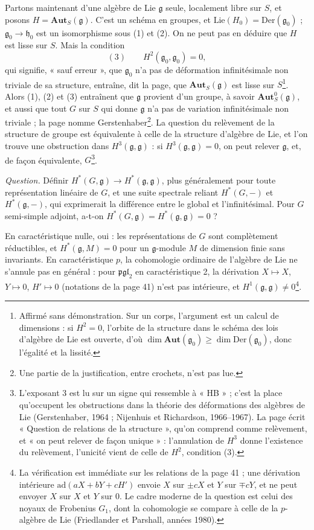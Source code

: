 \documentclass[11pt,a4paper]{article}
\begin{document}
Partons maintenant d'une algèbre de Lie $\mathfrak{g}$ seule, localement libre
sur $S$, et posons $H = \mathbf{Aut}_S(\mathfrak{g})$. C'est un schéma en groupes,
et $\mathrm{Lie}(H_0) = \mathrm{Der}(\mathfrak{g}_0)$ ; $\mathfrak{g}_0 \to
\mathfrak{h}_0$ est un isomorphisme sous (1) et (2). On ne peut pas en déduire que
$H$ est lisse sur $S$. Mais la condition
\[
(3) \qquad H^2(\mathfrak{g}_0, \mathfrak{g}_0) = 0,
\]
qui signifie, « sauf erreur », que $\mathfrak{g}_0$ n'a pas de déformation
infinitésimale non triviale de sa structure, entraîne, dit la page, que
$\mathbf{Aut}_S(\mathfrak{g})$ est lisse sur $S$\footnote{Affirmé sans
démonstration. Sur un corps, l'argument est un calcul de dimensions : si
$H^2 = 0$, l'orbite de la structure dans le schéma des lois d'algèbre de Lie est
ouverte, d'où $\dim \mathbf{Aut}(\mathfrak{g}_0) \geq \dim
\mathrm{Der}(\mathfrak{g}_0)$, donc l'égalité et la lissité.}. Alors (1), (2) et
(3) entraînent que $\mathfrak{g}$ provient d'un groupe, à savoir
$\mathbf{Aut}^0_S(\mathfrak{g})$, et aussi que tout $G$ sur $S$ qui donne
$\mathfrak{g}$ n'a pas de variation infinitésimale non triviale ; la page nomme
Gerstenhaber\footnote{Une partie de la justification, entre crochets, n'est pas
lue.}. La question du relèvement de la structure de groupe est équivalente à
celle de la structure d'algèbre de Lie, et l'on trouve une obstruction dans
$H^3(\mathfrak{g}, \mathfrak{g})$ : si $H^3(\mathfrak{g},\mathfrak{g}) = 0$, on peut
relever $\mathfrak{g}$, et, de façon équivalente, $G$\footnote{L'exposant 3 est lu
sur un signe qui ressemble à « HB » ; c'est la place qu'occupent les
obstructions dans la théorie des déformations des algèbres de Lie
(Gerstenhaber, 1964 ; Nijenhuis et Richardson, 1966--1967). La page écrit
« Question de relations de la structure », qu'on comprend comme relèvement, et
« on peut relever de façon unique » : l'annulation de $H^3$ donne l'existence du
relèvement, l'unicité vient de celle de $H^2$, condition (3).}.

\emph{Question.} Définir $H^*(G, \mathfrak{g}) \to H^*(\mathfrak{g}, \mathfrak{g})$,
plus généralement pour toute représentation linéaire de $G$, et une suite
spectrale reliant $H^*(G, -)$ et $H^*(\mathfrak{g}, -)$, qui exprimerait la
différence entre le global et l'infinitésimal. Pour $G$ semi-simple adjoint,
a-t-on $H^*(G,\mathfrak{g}) = H^*(\mathfrak{g},\mathfrak{g}) = 0$ ?

En caractéristique nulle, oui : les représentations de $G$ sont complètement
réductibles, et $H^*(\mathfrak{g}, M) = 0$ pour un $\mathfrak{g}$-module $M$ de
dimension finie sans invariants. En caractéristique $p$, la cohomologie
ordinaire de l'algèbre de Lie ne s'annule pas en général : pour
$\mathfrak{pgl}_2$ en caractéristique 2, la dérivation $X \mapsto X$, $Y \mapsto 0$,
$H' \mapsto 0$ (notations de la page 41) n'est pas intérieure, et
$H^1(\mathfrak{g},\mathfrak{g}) \neq 0$\footnote{La vérification est immédiate sur
les relations de la page 41 ; une dérivation intérieure $\mathrm{ad}(aX + bY +
cH')$ envoie $X$ sur $\pm cX$ et $Y$ sur $\mp cY$, et ne peut envoyer $X$ sur $X$ et
$Y$ sur $0$. Le cadre moderne de la question est celui des noyaux de Frobenius
$G_1$, dont la cohomologie se compare à celle de la $p$-algèbre de Lie
(Friedlander et Parshall, années 1980).}.
\end{document}
